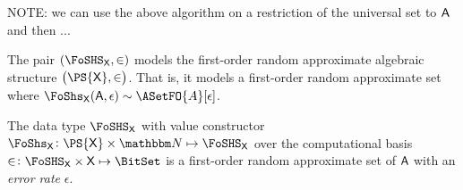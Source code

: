 \documentclass[ ../main.tex]{subfiles}
\begin{document}
NOTE: we can use the above algorithm on a restriction of the universal set to $\Set{A}$ and then ...

The pair $\left(\FoSHS_{\Set{X}}, \SetContains\right)$ models the first-order random approximate algebraic structure $\left(\PS{\Set{X}},\SetContains\right)$.
That is, it models a first-order random approximate set where $\FoShs_{\Set{X}}(\Set{A},\epsilon) \sim \ASetFO{A}[\epsilon]$.

\begin{theorem}
The data type $\FoSHS_{\Set{X}}$ with value constructor $\FoShs_{\Set{X}} \colon \PS{\Set{X}} \times \NatSet \mapsto \FoSHS_{\Set{X}}$ over the computational basis $\SetContains \colon \FoSHS_{\Set{X}} \times \Set{X} \mapsto \BitSet$ is a first-order random approximate set of $\Set{A}$ with an \emph{error rate} $\epsilon$.
\end{theorem}
\end{document}
